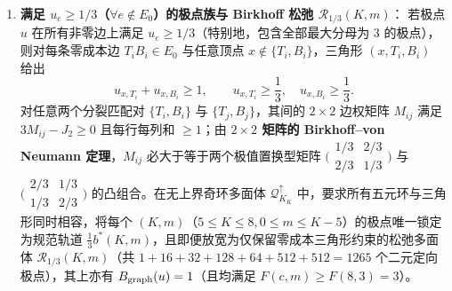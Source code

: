 \documentclass[11pt,a4paper]{ctexart}
\theoremstyle{definition}
\newcommand{\1}{\boldsymbol 1}
\newcommand{\0}{\boldsymbol 0}
\newcommand{\bgraph}{B_{\rm graph}}
\begin{document}
\begin{enumerate}[label=\textbf{类别 \Roman*:},leftmargin=*]
\item \textbf{满足 $u_e\ge 1/3$（$\forall e\notin E_0$）的极点族与 Birkhoff 松弛 $\mathcal R_{1/3}(K,m)$}：
若极点 $u$ 在所有非零边上满足 $u_e\ge 1/3$（特别地，包含全部最大分母为 $3$ 的极点），则对每条零成本边 $T_iB_i\in E_0$ 与任意顶点 $x\notin\{T_i,B_i\}$，三角形 $(x,T_i,B_i)$ 给出
\[
 u_{x,T_i} + u_{x,B_i} \ge 1,\qquad u_{x,T_i}\ge\frac{1}{3},\quad u_{x,B_i}\ge\frac{1}{3}.
\]
对任意两个分裂匹配对 $\{T_i,B_i\}$ 与 $\{T_j,B_j\}$，其间的 $2\times 2$ 边权矩阵 $M_{ij}$ 满足 $3M_{ij}-J_2\ge 0$ 且每行每列和 $\ge 1$；由 \textbf{$2\times 2$ 矩阵的 Birkhoff--von Neumann 定理}，$M_{ij}$ 必大于等于两个极值置换型矩阵 $\bigl(\begin{smallmatrix}1/3 & 2/3\\ 2/3 & 1/3\end{smallmatrix}\bigr)$ 与 $\bigl(\begin{smallmatrix}2/3 & 1/3\\ 1/3 & 2/3\end{smallmatrix}\bigr)$ 的凸组合。在无上界奇环多面体 $\mathcal Q_{K_K}^{\uparrow}$ 中，要求所有五元环与三角形同时相容，将每个 $(K,m)$（$5\le K\le 8,0\le m\le K-5$）的极点唯一锁定为规范轨道 $\frac{1}{3}b^*(K,m)$，且即便放宽为仅保留零成本三角形约束的松弛多面体 $\mathcal R_{1/3}(K,m)$（共 $1+16+32+128+64+512+512=1265$ 个二元定向极点），其上亦有 $\bgraph(u)=1$（且均满足 $F(c,m)\ge F(8,3)=3$）。


\end{enumerate}
\end{document}
